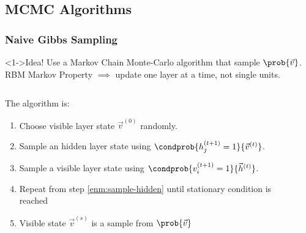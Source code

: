 \subsection{MCMC Algorithms}
\begin{frame}
  \frametitle{Naive Gibbs Sampling}
  \begin{alertblock}<1->{Idea!}
    Use a \alert{Markov Chain Monte-Carlo} algorithm that sample \(\prob{\vec{v}}\).\\
    RBM Markov Property \(\implies\) update one layer at a time, not single units.
  \end{alertblock}
  \vfill
  \begin{columns}
    \begin{column}{0.62\textwidth}
    	\onslide<2->
      The algorithm is:
      \begin{enumerate}
        \item Choose visible layer state \(\vec{v}^{(0)}\) randomly.
        \item\label{enm:sample-hidden} Sample an hidden layer state using \(\condprob{h^{(t+1)}_j=1}{\vec{v}^{(t)}}\).
        \item Sample a visible layer state using \(\condprob{v^{(t+1)}_i=1}{\vec{h}^{(t)}}\).
        \item Repeat from step \ref{enm:sample-hidden} until stationary condition is reached
        \item Visible state \(\vec{v}^{(s)}\) is a sample from \(\prob{\vec{v}}\)
      \end{enumerate}
    \end{column}
    \begin{column}{0.35\textwidth}
    \end{column}
  \end{columns}
\end{frame}

